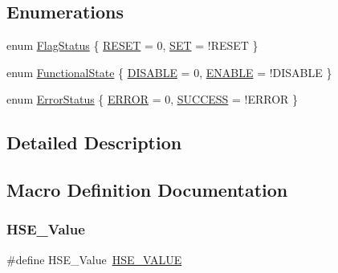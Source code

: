 \subsection*{Enumerations}
\begin{DoxyCompactItemize}
\item 
enum \hyperlink{group___exported__types_ga89136caac2e14c55151f527ac02daaff}{Flag\+Status} \{ \hyperlink{group___exported__types_gga89136caac2e14c55151f527ac02daaffa589b7d94a3d91d145720e2fed0eb3a05}{R\+E\+S\+ET} = 0, 
\hyperlink{group___exported__types_gga89136caac2e14c55151f527ac02daaffab44c8101cc294c074709ec1b14211792}{S\+ET} = !\+R\+E\+S\+ET
 \}
\item 
enum \hyperlink{group___exported__types_gac9a7e9a35d2513ec15c3b537aaa4fba1}{Functional\+State} \{ \hyperlink{group___exported__types_ggac9a7e9a35d2513ec15c3b537aaa4fba1ad3a9df141be0ccf10389b640f492b26d}{D\+I\+S\+A\+B\+LE} = 0, 
\hyperlink{group___exported__types_ggac9a7e9a35d2513ec15c3b537aaa4fba1a7d46875fa3ebd2c34d2756950eda83bf}{E\+N\+A\+B\+LE} = !\+D\+I\+S\+A\+B\+LE
 \}
\item 
enum \hyperlink{group___exported__types_ga8333b96c67f83cba354b3407fcbb6ee8}{Error\+Status} \{ \hyperlink{group___exported__types_gga8333b96c67f83cba354b3407fcbb6ee8a2fd6f336d08340583bd620a7f5694c90}{E\+R\+R\+OR} = 0, 
\hyperlink{group___exported__types_gga8333b96c67f83cba354b3407fcbb6ee8ac7f69f7c9e5aea9b8f54cf02870e2bf8}{S\+U\+C\+C\+E\+SS} = !\+E\+R\+R\+OR
 \}
\end{DoxyCompactItemize}


\subsection{Detailed Description}


\subsection{Macro Definition Documentation}
\mbox{\label{group___exported__types_gab12a1abe6dd0001e7a0487a8b175b28c}} 
\subsubsection{\texorpdfstring{H\+S\+E\+\_\+\+Value}{HSE\_Value}}
{\footnotesize\ttfamily \#define H\+S\+E\+\_\+\+Value~\hyperlink{group___library__configuration__section_gaeafcff4f57440c60e64812dddd13e7cb}{H\+S\+E\+\_\+\+V\+A\+L\+UE}}



